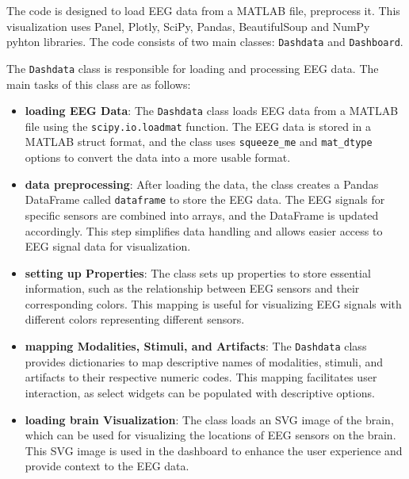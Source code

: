 \documentclass[format=sigconf]{acmart}
\begin{document}
			\par The code is designed to load EEG data from a MATLAB file, preprocess it. This visualization uses Panel, Plotly, SciPy, Pandas, BeautifulSoup and NumPy pyhton libraries. The code consists of two main classes: \texttt{Dashdata} and \texttt{Dashboard}.
			
			\par The \texttt{Dashdata} class is responsible for loading and processing EEG data. The main tasks of this class are as follows:
			
			\begin{itemize}
				
				\item{\textbf{loading EEG Data}}: The \texttt{Dashdata} class loads EEG data from a MATLAB file using the \texttt{scipy.io.loadmat} function. The EEG data is stored in a MATLAB struct format, and the class uses \texttt{squeeze\_me} and \texttt{mat\_dtype} options to convert the data into a more usable format.
			
				\item{\textbf{data preprocessing}}: After loading the data, the class creates a Pandas DataFrame called \texttt{dataframe} to store the EEG data. The EEG signals for specific sensors are combined into arrays, and the DataFrame is updated accordingly. This step simplifies data handling and allows easier access to EEG signal data for visualization.
				
				\item{\textbf{setting up Properties}}: The class sets up properties to store essential information, such as the relationship between EEG sensors and their corresponding colors. This mapping is useful for visualizing EEG signals with different colors representing different sensors.
				
				\item{\textbf{mapping Modalities, Stimuli, and Artifacts}}: The \texttt{Dashdata} class provides dictionaries to map descriptive names of modalities, stimuli, and artifacts to their respective numeric codes. This mapping facilitates user interaction, as select widgets can be populated with descriptive options.
				
				\item{\textbf{loading brain Visualization}}: The class loads an SVG image of the brain, which can be used for visualizing the locations of EEG sensors on the brain. This SVG image is used in the dashboard to enhance the user experience and provide context to the EEG data.
			\end{itemize}
			
\end{document}
